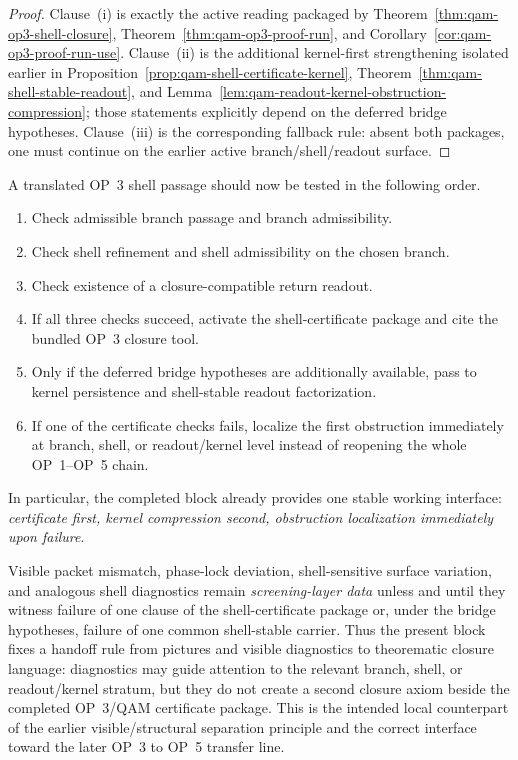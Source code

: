 \begin{proof}
Clause~(i) is exactly the active reading packaged by Theorem~\ref{thm:qam-op3-shell-closure}, Theorem~\ref{thm:qam-op3-proof-run}, and Corollary~\ref{cor:qam-op3-proof-run-use}. Clause~(ii) is the additional kernel-first strengthening isolated earlier in Proposition~\ref{prop:qam-shell-certificate-kernel}, Theorem~\ref{thm:qam-shell-stable-readout}, and Lemma~\ref{lem:qam-readout-kernel-obstruction-compression}; those statements explicitly depend on the deferred bridge hypotheses. Clause~(iii) is the corresponding fallback rule: absent both packages, one must continue on the earlier active branch/shell/readout surface.
\end{proof}

\begin{corollary}\label{cor:qam-op3-operational-checklist}
A translated OP~3 shell passage should now be tested in the following order.
\begin{enumerate}[leftmargin=2em]
  \item Check admissible branch passage and branch admissibility.
  \item Check shell refinement and shell admissibility on the chosen branch.
  \item Check existence of a closure-compatible return readout.
  \item If all three checks succeed, activate the shell-certificate package and cite the bundled OP~3 closure tool.
  \item Only if the deferred bridge hypotheses are additionally available, pass to kernel persistence and shell-stable readout factorization.
  \item If one of the certificate checks fails, localize the first obstruction immediately at branch, shell, or readout/kernel level instead of reopening the whole OP~1--OP~5 chain.
\end{enumerate}
In particular, the completed block already provides one stable working interface: \emph{certificate first, kernel compression second, obstruction localization immediately upon failure}.
\end{corollary}

\begin{remark}\label{rem:qam-op3-diagnostic-handoff}
Visible packet mismatch, phase-lock deviation, shell-sensitive surface variation, and analogous shell diagnostics remain \emph{screening-layer data} unless and until they witness failure of one clause of the shell-certificate package or, under the bridge hypotheses, failure of one common shell-stable carrier. Thus the present block fixes a handoff rule from pictures and visible diagnostics to theorematic closure language: diagnostics may guide attention to the relevant branch, shell, or readout/kernel stratum, but they do not create a second closure axiom beside the completed OP~3/QAM certificate package. This is the intended local counterpart of the earlier visible/structural separation principle and the correct interface toward the later OP~3 to OP~5 transfer line.
\end{remark}

